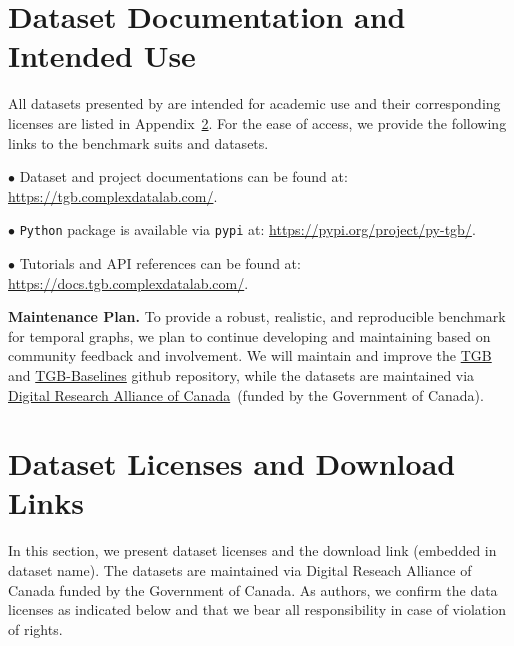 \appendix

\section{Dataset Documentation and Intended Use}
All datasets presented by \name are intended for academic use and their corresponding licenses are listed in Appendix~\ref{app:license}. 
For the ease of access, we provide the following links to the \name benchmark suits and datasets.

\textit{$\bullet$} Dataset and project documentations can be found at: \url{https://tgb.complexdatalab.com/}.

\textit{$\bullet$} \name \texttt{Python} package is available via \texttt{pypi} at: \url{https://pypi.org/project/py-tgb/}.

\textit{$\bullet$} Tutorials and API references can be found at: \url{https://docs.tgb.complexdatalab.com/}.

\textbf{Maintenance Plan.} To provide a robust, realistic, and reproducible benchmark for temporal graphs, we plan to continue developing and maintaining \name based on community feedback and involvement. 
We will maintain and improve the \href{https://shenyanghuang.github.io/TGB/}{TGB} and \href{https://github.com/fpour/TGB_Baselines}{TGB-Baselines} github repository, while the \name datasets are maintained via \href{https://alliancecan.ca/en}{Digital Research Alliance of Canada}~(funded by the Government of Canada). 


\section{Dataset Licenses and Download Links} \label{app:license}

In this section, we present dataset licenses and the download link (embedded in dataset name). 
The datasets are maintained via Digital Reseach Alliance of Canada funded by the Government of Canada.
As authors, we confirm the data licenses as indicated below and that we bear all responsibility in case of violation of rights.

